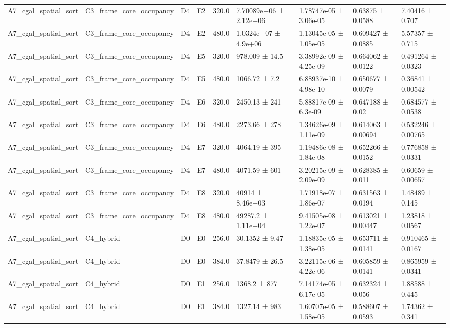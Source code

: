 \begin{table}
\begin{tabular}{lllllllll}
A7\_cgal\_spatial\_sort & C3\_frame\_core\_occupancy & D4 & E2 & 320.0 & 7.70089e+06 ± 2.12e+06 & 1.78747e-05 ± 3.06e-05 & 0.63875 ± 0.0588 & 7.40416 ± 0.707 \\
A7\_cgal\_spatial\_sort & C3\_frame\_core\_occupancy & D4 & E2 & 480.0 & 1.0324e+07 ± 4.9e+06 & 1.13045e-05 ± 1.05e-05 & 0.609427 ± 0.0885 & 5.57357 ± 0.715 \\
A7\_cgal\_spatial\_sort & C3\_frame\_core\_occupancy & D4 & E5 & 320.0 & 978.009 ± 14.5 & 3.38992e-09 ± 4.25e-09 & 0.664062 ± 0.0122 & 0.491264 ± 0.0323 \\
A7\_cgal\_spatial\_sort & C3\_frame\_core\_occupancy & D4 & E5 & 480.0 & 1066.72 ± 7.2 & 6.88937e-10 ± 4.98e-10 & 0.650677 ± 0.0079 & 0.36841 ± 0.00542 \\
A7\_cgal\_spatial\_sort & C3\_frame\_core\_occupancy & D4 & E6 & 320.0 & 2450.13 ± 241 & 5.88817e-09 ± 6.3e-09 & 0.647188 ± 0.02 & 0.684577 ± 0.0538 \\
A7\_cgal\_spatial\_sort & C3\_frame\_core\_occupancy & D4 & E6 & 480.0 & 2273.66 ± 278 & 1.34626e-09 ± 1.11e-09 & 0.614063 ± 0.00694 & 0.532246 ± 0.00765 \\
A7\_cgal\_spatial\_sort & C3\_frame\_core\_occupancy & D4 & E7 & 320.0 & 4064.19 ± 395 & 1.19486e-08 ± 1.84e-08 & 0.652266 ± 0.0152 & 0.776858 ± 0.0331 \\
A7\_cgal\_spatial\_sort & C3\_frame\_core\_occupancy & D4 & E7 & 480.0 & 4071.59 ± 601 & 3.20215e-09 ± 2.09e-09 & 0.628385 ± 0.011 & 0.60659 ± 0.00657 \\
A7\_cgal\_spatial\_sort & C3\_frame\_core\_occupancy & D4 & E8 & 320.0 & 40914 ± 8.46e+03 & 1.71918e-07 ± 1.86e-07 & 0.631563 ± 0.0194 & 1.48489 ± 0.145 \\
A7\_cgal\_spatial\_sort & C3\_frame\_core\_occupancy & D4 & E8 & 480.0 & 49287.2 ± 1.11e+04 & 9.41505e-08 ± 1.22e-07 & 0.613021 ± 0.00447 & 1.23818 ± 0.0567 \\
A7\_cgal\_spatial\_sort & C4\_hybrid & D0 & E0 & 256.0 & 30.1352 ± 9.47 & 1.18835e-05 ± 1.38e-05 & 0.653711 ± 0.0141 & 0.910465 ± 0.0167 \\
A7\_cgal\_spatial\_sort & C4\_hybrid & D0 & E0 & 384.0 & 37.8479 ± 26.5 & 3.22115e-06 ± 4.22e-06 & 0.605859 ± 0.0141 & 0.865959 ± 0.0341 \\
A7\_cgal\_spatial\_sort & C4\_hybrid & D0 & E1 & 256.0 & 1368.2 ± 877 & 7.14174e-05 ± 6.17e-05 & 0.632324 ± 0.056 & 1.88588 ± 0.445 \\
A7\_cgal\_spatial\_sort & C4\_hybrid & D0 & E1 & 384.0 & 1327.14 ± 983 & 1.60707e-05 ± 1.58e-05 & 0.588607 ± 0.0593 & 1.74362 ± 0.341 \\

\end{tabular}
\end{table}

